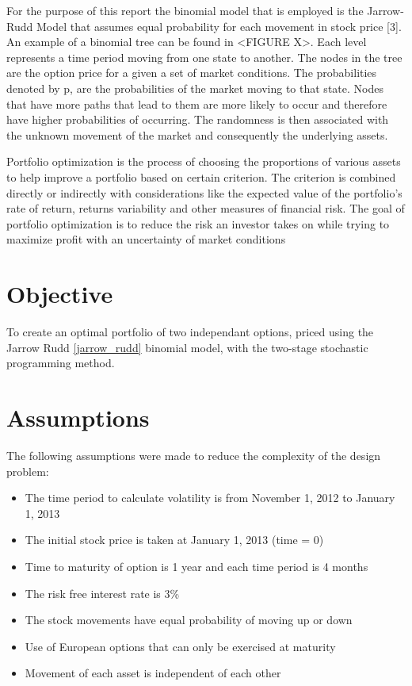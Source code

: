 \documentclass[12pt]{article}
\begin{document}
For the purpose of this report the binomial model that is employed is the Jarrow-Rudd Model that assumes equal probability for each movement in stock price [3]. An example of a binomial tree can be found in <FIGURE X>. Each level represents a time period moving from one state to another. The nodes in the tree are the option price for a given a set of market conditions. The probabilities denoted by p, are the probabilities of the market moving to that state. Nodes that have more paths that lead to them are more likely to occur and therefore have higher probabilities of occurring. The randomness is then associated with the unknown movement of the market and consequently the underlying assets.

 
Portfolio optimization is the process of choosing the proportions of various assets to help improve a portfolio based on certain criterion. The criterion is combined directly or indirectly with considerations like the expected value of the portfolio’s rate of return, returns variability and other measures of financial risk. The goal of portfolio optimization is to reduce the risk an investor takes on while trying to maximize profit with an uncertainty of market conditions


\section{Objective}
To create an optimal portfolio of two independant options, priced using the Jarrow Rudd \ref{jarrow_rudd} binomial model, with the two-stage stochastic programming method.

\section{Assumptions}

The following assumptions were made to reduce the complexity of the design problem:
\begin{itemize}
	\item The time period to calculate volatility is from November 1, 2012 to January 1, 2013
	\item The initial stock price is taken at January 1, 2013 (time = 0)
	\item Time to maturity of option is 1 year and each time period is 4 months
	\item The risk free interest rate is 3\%
	\item The stock movements have equal probability of moving up or down
	\item Use of European options that can only be exercised at maturity
	\item Movement of each asset is independent of each other
\end{itemize}
\end{document}
